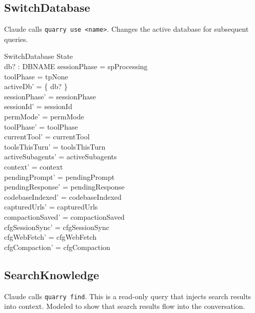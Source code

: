 \documentclass[a4paper,10pt,fleqn]{article}
\begin{document}
\subsection{SwitchDatabase}

Claude calls \texttt{quarry use <name>}. Changes the active database
for subsequent queries.

\begin{schema}{SwitchDatabase}
  \Delta State \\
  db? : DBNAME
  \where
  sessionPhase = spProcessing \\
  toolPhase = tpNone \\
  activeDb' = \{ db? \} \\
  sessionPhase' = sessionPhase \\
  sessionId' = sessionId \\
  permMode' = permMode \\
  toolPhase' = toolPhase \\
  currentTool' = currentTool \\
  toolsThisTurn' = toolsThisTurn \\
  activeSubagents' = activeSubagents \\
  context' = context \\
  pendingPrompt' = pendingPrompt \\
  pendingResponse' = pendingResponse \\
  codebaseIndexed' = codebaseIndexed \\
  capturedUrls' = capturedUrls \\
  compactionSaved' = compactionSaved \\
  cfgSessionSync' = cfgSessionSync \\
  cfgWebFetch' = cfgWebFetch \\
  cfgCompaction' = cfgCompaction
\end{schema}

\subsection{SearchKnowledge}

Claude calls \texttt{quarry find}. This is a read-only query that
injects search results into context. Modeled to show that search
results flow into the conversation.
\end{document}
